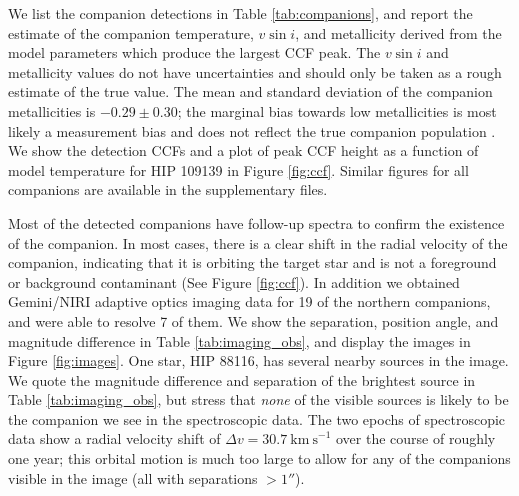 \documentclass{emulateapj}
\begin{document}
We list the companion detections in Table \ref{tab:companions}, and report the estimate of the companion temperature, $v\sin{i}$, and metallicity derived from the model parameters which produce the largest CCF peak. The $v\sin{i}$ and metallicity values do not have uncertainties and should only be taken as a rough estimate of the true value. The mean and standard deviation of the companion metallicities is $-0.29 \pm 0.30$; the marginal bias towards low metallicities is most likely a measurement bias and does not reflect the true companion population \citep{Gullikson2016}.  We show the detection CCFs and a plot of peak CCF height as a function of model temperature for HIP 109139 in Figure \ref{fig:ccf}. Similar figures for all companions are available in the supplementary files.


Most of the detected companions have follow-up spectra to confirm the existence of the companion. In most cases, there is a clear shift in the radial velocity of the companion, indicating that it is orbiting the target star and is not a foreground or background contaminant (See Figure \ref{fig:ccf}). In addition we obtained Gemini/NIRI adaptive optics imaging data for 19 of the northern companions, and were able to resolve 7 of them. We show the separation, position angle, and magnitude difference in Table \ref{tab:imaging_obs}, and display the images in Figure \ref{fig:images}. One star, HIP 88116, has several nearby sources in the image. We quote the magnitude difference and separation of the brightest source in Table \ref{tab:imaging_obs}, but stress that \emph{none} of the visible sources is likely to be the companion we see in the spectroscopic data. The two epochs of spectroscopic data show a radial velocity shift of $\Delta v = 30.7\ \mathrm{km\ s}^{-1}$ over the course of roughly one year; this orbital motion is much too large to allow for any of the companions visible in the image (all with separations $ > 1''$).
\end{document}
